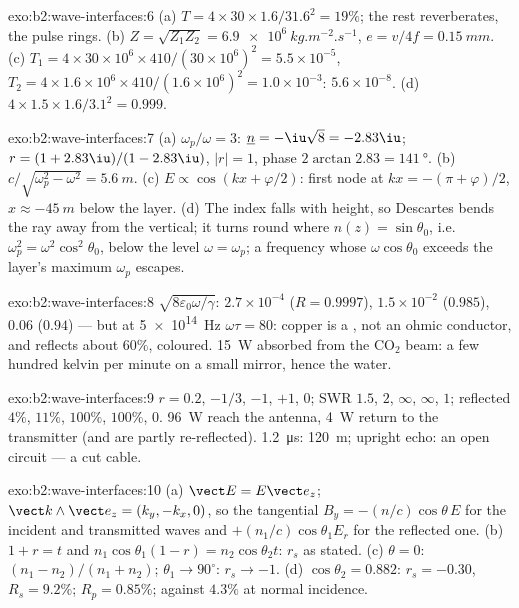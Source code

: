 \begin{solution}{exo:b2:wave-interfaces:6}
(a) $T = 4 \times 30 \times 1.6/31.6^2 = 19\%$; the rest reverberates, the pulse
rings. (b) $Z = \sqrt{Z_1Z_2} = \qty{6.9e6}{kg.m^{-2}.s^{-1}}$, $e = v/4f = \qty{0.15}{mm}$.
(c) $T_1 = 4 \times 30 \times 10^6 \times 410/(30 \times 10^6)^2 = 5.5 \times 10^{-5}$, $T_2 = 4 \times 1.6 \times
10^6 \times 410/(1.6 \times 10^6)^2 = 1.0 \times 10^{-3}$: $5.6 \times 10^{-8}$. (d) $4 \times 1.5 \times 1.6/
3.1^2 = 0.999$.
\end{solution}

\begin{solution}{exo:b2:wave-interfaces:7}
(a) $\omega_p/\omega = 3$: $\underline n = -\iu\sqrt8 = -2.83\iu$; $r = (1 + 2.83\iu)/(1 - 2.83
\iu)$, $|r| = 1$, phase $2\arctan2.83 = \qty{141}{\degree}$. (b) $c/\sqrt{\omega_p^2 - \omega^2}
= \qty{5.6}{m}$. (c) $E \propto \cos(kx + \varphi/2)$: first node at $kx = -(\pi + \varphi)/2$,
$x \approx \qty{-45}{m}$ below the layer. (d) The index falls with height, so
Descartes bends the ray away from the vertical; it turns round where
$n(z) = \sin\theta_0$, i.e.\ $\omega_p^2 = \omega^2\cos^2\theta_0$, below the level $\omega = \omega_p$;
a frequency whose $\omega\cos\theta_0$ exceeds the layer's maximum $\omega_p$
escapes.
\end{solution}

\begin{solution}{exo:b2:wave-interfaces:8}
$\sqrt{8\varepsilon_0\omega/\gamma}$: $2.7 \times 10^{-4}$ ($R = 0.9997$), $1.5 \times 10^{-2}$ ($0.985$),
$0.06$ ($0.94$) --- but at \qty{5e14}{Hz} $\omega\tau = 80$: copper is a ,
not an ohmic conductor, and reflects about $60\%$, coloured. \qty{15}{W}
absorbed from the CO$_2$ beam: a few hundred kelvin per minute on a
small mirror, hence the water.
\end{solution}

\begin{solution}{exo:b2:wave-interfaces:9}
$r = 0.2$, $-1/3$, $-1$, $+1$, $0$; SWR $1.5$, $2$, $\infty$, $\infty$, $1$; reflected
$4\%$, $11\%$, $100\%$, $100\%$, $0$. \qty{96}{W} reach the antenna, \qty{4}{W}
return to the transmitter (and are partly re-reflected). \qty{1.2}{\micro s}:
\qty{120}{m}; upright echo: an open circuit --- a cut cable.
\end{solution}

\begin{solution}{exo:b2:wave-interfaces:10}
(a) $\vect E = E\vect e_z$; $\vect k\wedge\vect e_z = (k_y, -k_x, 0)$, so the tangential
$B_y = -(n/c)\cos\theta\,E$ for the incident and transmitted waves and
$+(n_1/c)\cos\theta_1E_r$ for the reflected one. (b) $1 + r = t$ and $n_1\cos\theta_1
(1 - r) = n_2\cos\theta_2t$: $r_s$ as stated. (c) $\theta = 0$: $(n_1 - n_2)/(n_1 +
n_2)$; $\theta_1 \to 90^\circ$: $r_s \to -1$. (d) $\cos\theta_2 = 0.882$: $r_s = -0.30$, $R_s =
9.2\%$; $R_p = 0.85\%$; against $4.3\%$ at normal incidence.
\end{solution}

